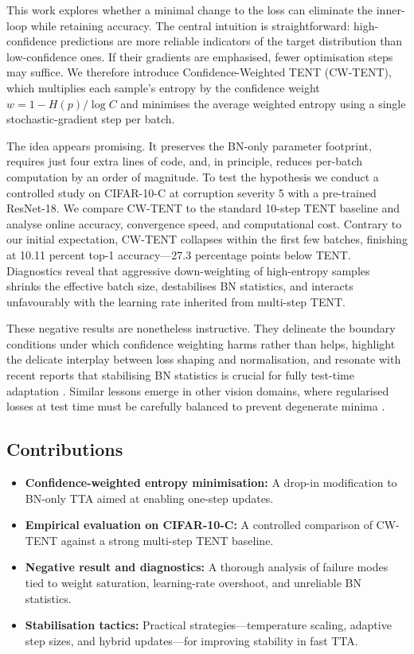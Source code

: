 \documentclass{article} %
\begin{document}
This work explores whether a minimal change to the loss can eliminate the inner-loop while retaining accuracy. The central intuition is straightforward: high-confidence predictions are more reliable indicators of the target distribution than low-confidence ones. If their gradients are emphasised, fewer optimisation steps may suffice. We therefore introduce Confidence-Weighted TENT (CW-TENT), which multiplies each sample’s entropy by the confidence weight \(w = 1 - H(p)/\log C\) and minimises the average weighted entropy using a single stochastic-gradient step per batch.

The idea appears promising. It preserves the BN-only parameter footprint, requires just four extra lines of code, and, in principle, reduces per-batch computation by an order of magnitude. To test the hypothesis we conduct a controlled study on CIFAR-10-C at corruption severity 5 with a pre-trained ResNet-18. We compare CW-TENT to the standard 10-step TENT baseline and analyse online accuracy, convergence speed, and computational cost. Contrary to our initial expectation, CW-TENT collapses within the first few batches, finishing at 10.11 percent top-1 accuracy—27.3 percentage points below TENT. Diagnostics reveal that aggressive down-weighting of high-entropy samples shrinks the effective batch size, destabilises BN statistics, and interacts unfavourably with the learning rate inherited from multi-step TENT.

These negative results are nonetheless instructive. They delineate the boundary conditions under which confidence weighting harms rather than helps, highlight the delicate interplay between loss shaping and normalisation, and resonate with recent reports that stabilising BN statistics is crucial for fully test-time adaptation \cite{zhao-2023-delta}. Similar lessons emerge in other vision domains, where regularised losses at test time must be carefully balanced to prevent degenerate minima \cite{author-year-test}.

\subsection{Contributions}
\begin{itemize}
\item \textbf{Confidence-weighted entropy minimisation:} A drop-in modification to BN-only TTA aimed at enabling one-step updates.
\item \textbf{Empirical evaluation on CIFAR-10-C:} A controlled comparison of CW-TENT against a strong multi-step TENT baseline.
\item \textbf{Negative result and diagnostics:} A thorough analysis of failure modes tied to weight saturation, learning-rate overshoot, and unreliable BN statistics.
\item \textbf{Stabilisation tactics:} Practical strategies—temperature scaling, adaptive step sizes, and hybrid updates—for improving stability in fast TTA.
\end{itemize}
\end{document}
